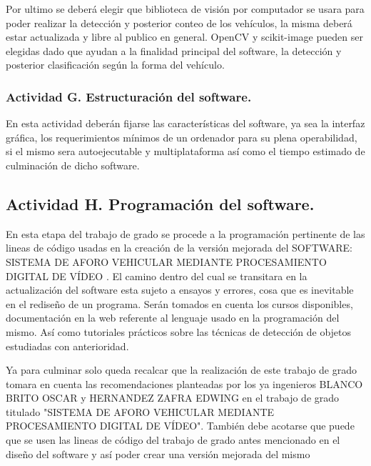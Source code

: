 Por ultimo se deberá elegir que biblioteca de visión por computador se usara para poder realizar la detección y posterior conteo de los vehículos, la misma deberá estar actualizada y libre al publico en general. OpenCV y scikit-image pueden ser elegidas dado que ayudan a la finalidad principal del software, la detección y posterior clasificación según la forma del vehículo.

\subsubsection{Actividad G. Estructuración del software.}

En esta actividad deberán fijarse las características del software, ya sea la interfaz gráfica, los requerimientos mínimos de un ordenador para su plena operabilidad, si el mismo sera autoejecutable y multiplataforma así como el tiempo estimado de culminación de dicho software.

\subsection{Actividad H. Programación del software.}

En esta etapa del trabajo de grado se procede a la programación pertinente de las lineas de código usadas en la creación de la versión mejorada del SOFTWARE: SISTEMA DE AFORO VEHICULAR MEDIANTE PROCESAMIENTO DIGITAL DE VÍDEO . El camino dentro del cual se transitara en la actualización del software esta sujeto a ensayos y errores, cosa que es inevitable en el rediseño de un programa. Serán tomados en cuenta los cursos disponibles, documentación en la web referente al lenguaje usado en la programación del mismo. Así como tutoriales prácticos sobre las técnicas de detección de objetos estudiadas con anterioridad. 

Ya para culminar solo queda recalcar que la realización de este trabajo de grado tomara en cuenta las recomendaciones planteadas por los ya ingenieros BLANCO BRITO OSCAR y HERNANDEZ ZAFRA EDWING en el trabajo de grado titulado "SISTEMA DE AFORO VEHICULAR MEDIANTE PROCESAMIENTO DIGITAL DE VÍDEO". También debe acotarse que puede que se usen las lineas de código del trabajo de grado antes mencionado en el diseño del software y así poder crear una versión mejorada del mismo


